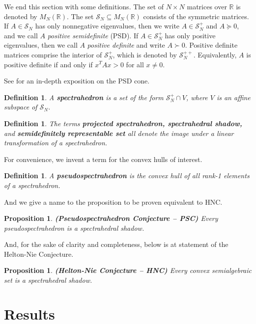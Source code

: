 \documentclass[11pt]{article} %
\newtheorem{prop}[thm]{Proposition}
\newtheorem{defn}[thm]{Definition}
\newcommand{\R}{\mathbb{R}}
\newcommand{\s}{\mathcal{S}}
\begin{document}
We end this section with some definitions. The set of $N\times N$ matrices over $\R$ is denoted by $M_N(\R)$. The set $\s_N\subseteq M_N(\R)$ consists of the symmetric matrices. If $A\in\s_N$ has only nonnegative eigenvalues, then we write $A \in \s_N^+$ and $A \succeq 0$, and we call $A$ \emph{positive semidefinite} (PSD). If $A \in \s_N^+$ has only positive eigenvalues, then we call $A$ \emph{positive definite} and write $A \succ 0$. Positive definite matrices comprise the interior of $\s_N^+$, which is denoted by $\s_N^{++}$. Equivalently, $A$ is positive definite if and only if $x^TAx >0$ for all $x \neq 0$. 

See \cite{Barvinok} for an in-depth exposition on the PSD cone. 

\begin{defn}
A {\bf spectrahedron} is a set of the form $\s_N^+ \cap V$, where $V$ is an affine subspace of $\s_N$. 
\end{defn}

\begin{defn}
The terms {\bf projected spectrahedron, spectrahedral shadow,} and {\bf semidefinitely representable set} all denote the image under a linear transformation of a spectrahedron.
\end{defn}

For convenience, we invent a term for the convex hulls of interest.

\begin{defn}
A {\bf pseudospectrahedron} is the convex hull of all rank-1 elements of a spectrahedron.  
\end{defn}

And we give a name to the proposition to be proven equivalent to HNC. 

\begin{prop}{\bf (\emph{Pseudospectrahedron Conjecture -- PSC})} Every pseudospectrahedron is a spectrahedral shadow.
\end{prop}

And, for the sake of clarity and completeness, below is at statement of the Helton-Nie Conjecture.

\begin{prop}{\bf (\emph{Helton-Nie Conjecture -- HNC})} Every convex semialgebraic set is a spectrahedral shadow.
\end{prop}






\section{Results}
\end{document}
